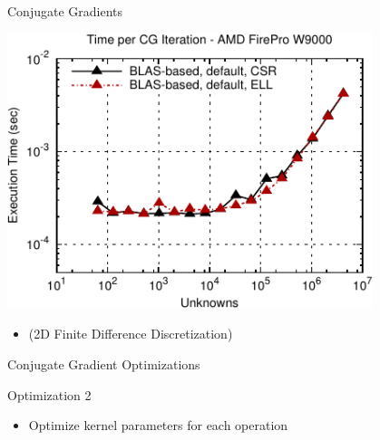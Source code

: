 \begin{frame}[fragile]{Conjugate Gradients}
 \begin{block}{}
 \begin{center}
  \vspace*{-0.5cm}
  \includegraphics[width=0.8\textwidth]{figures/cg-firepro-w9000-1}
 \end{center}

 \begin{itemize}
  \item   \vspace*{-0.3cm} {\small (2D Finite Difference Discretization)}
 \end{itemize}
 \end{block}   
\end{frame}


\begin{frame}[fragile]{Conjugate Gradient Optimizations}

 \begin{block}{Optimization 2}
   \begin{itemize}
   \item Optimize kernel parameters for each operation
  \end{itemize}
 \end{block}
   
\end{frame}

